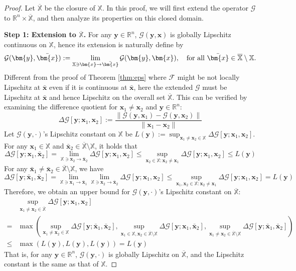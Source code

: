 \documentclass{amsart} %
\def\vx{{\bm{x}}}
\def\vy{{\bm{y}}}
\def\sR{{\mathbb{R}}}
\def\sX{{\mathbb{X}}}
\def\cF{{\mathcal{F}}}
\def\cG{{\mathcal{G}}}
\theoremstyle{definition}
\theoremstyle{remark}
\begin{document}
\begin{proof}%
Let $\overline{\sX}$ be the closure of $\sX$. In this proof, we will first extend the operator $\cG$ to $\sR^n \times \overline{\sX}$, and then analyze its properties on this closed domain.

\textbf{Step 1: Extension to $\overline{\sX}$.} For any $\vy \in \sR^n$, $\cG(\vy,\vx)$ is globally Lipschitz continuous on $\sX$, hence its extension is naturally define by
\[ \cG(\vy,\bar \vx) := \lim_{\sX\ni \vx\to\bar \vx}\cG(\vy, \vx) ,\quad \textup{for all }\bar \vx \in \overline{\sX} \setminus \sX. \]
Different from the proof of Theorem \ref{thm:eps} where $\cF$ might be not locally Lipschitz at $\bar \vx$ even if it is continuous at $\bar \vx$, here the extended $\cG$ must be Lipschitz at $\bar \vx$ and hence Lipschitz on the overall set $\overline{\sX}$. This can be verified by examining the difference quotient for $\vx_1 \neq \vx_2$ and $\vy \in \sR^n$:
\[ \Delta \cG[\vy; \vx_1,\vx_2]:= \frac{\|\cG(\vy,\vx_1)-\cG(\vy,\vx_2)\|}{\|\vx_1-\vx_2\|} \]
Let $\cG(\vy,\cdot)$'s Lipschitz constant on $\sX$ be $L(\vy):= \sup_{\vx_1\neq\vx_2 \in \sX}\Delta \cG[\vy; \vx_1,\vx_2]$. For any $\vx_1 \in \sX$ and $\bar{\vx}_2 \in \overline{\sX}\setminus\sX$, it holds that
\[
\Delta \cG[\vy; \vx_1,\bar{\vx}_2] =  \lim_{\sX\ni \vx_2\to \bar{\vx}_2}\Delta \cG[\vy; \vx_1,\vx_2] \leq \sup_{\vx_2 \in \sX:\vx_2 \neq \vx_1}\Delta \cG[\vy; \vx_1,\vx_2] \leq L(\vy)
\]
For any $\bar{\vx}_1 \neq \bar{\vx}_2 \in \overline{\sX}\setminus\sX$, we have
\[
\Delta \cG[\vy; \bar{\vx}_1,\bar{\vx}_2] =  \lim_{\sX\ni \vx_1\to \bar{\vx}_1}\lim_{\sX\ni \vx_2\to \bar{\vx}_2}\Delta \cG[\vy; \vx_1,\vx_2] \leq \sup_{\vx_1,\vx_2 \in \sX:\vx_2 \neq \vx_1}\Delta \cG[\vy; \vx_1,\vx_2] = L(\vy)
\]
Therefore, we obtain an upper bound for $\cG(\vy,\cdot)$'s Lipschitz constant on $\overline{\sX}$:
\begin{align*}
& \sup_{\vx_1\neq\vx_2\in\overline{\sX}} \Delta \cG[\vy; \vx_1,\vx_2] \\
=& \max\left( 
\sup_{\vx_1\neq\vx_2 \in \sX} \Delta \cG[\vy; \bar{\vx}_1,\bar{\vx}_2],
\sup_{\vx_1\in\sX,\vx_2\in\overline{\sX}\setminus\sX} \Delta \cG[\vy; \vx_1,\bar{\vx}_2], 
\sup_{\vx_1\neq\vx_2 \in \overline{\sX}\setminus\sX} \Delta \cG[\vy; \bar{\vx}_1,\bar{\vx}_2] 
\right) \\
\leq & \max\left( L(\vy),L(\vy),L(\vy) \right) = L(\vy)
\end{align*}
That is, for any $\vy \in \sR^n$, $\cG(\vy,\cdot)$ is globally Lipschitz on $\overline{\sX}$, and the Lipschitz constant is the same as that of $\sX$.


\end{proof}
\end{document}

